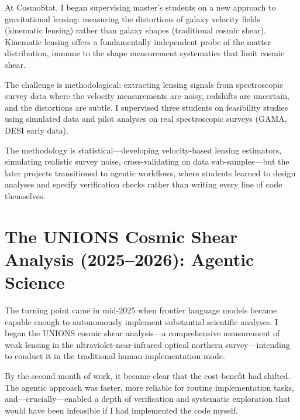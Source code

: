 \documentclass[11pt,a4paper]{article}
\begin{document}
At CosmoStat, I began supervising master's students on a new approach to gravitational lensing: measuring the distortions of galaxy velocity fields (kinematic lensing) rather than galaxy shapes (traditional cosmic shear). Kinematic lensing offers a fundamentally independent probe of the matter distribution, immune to the shape measurement systematics that limit cosmic shear.

The challenge is methodological: extracting lensing signals from spectroscopic survey data where the velocity measurements are noisy, redshifts are uncertain, and the distortions are subtle. I supervised three students on feasibility studies using simulated data and pilot analyses on real spectroscopic surveys (GAMA, DESI early data).

The methodology is statistical---developing velocity-based lensing estimators, simulating realistic survey noise, cross-validating on data sub-samples---but the later projects transitioned to agentic workflows, where students learned to design analyses and specify verification checks rather than writing every line of code themselves.

\section*{The UNIONS Cosmic Shear Analysis (2025--2026): Agentic Science}

The turning point came in mid-2025 when frontier language models became capable enough to autonomously implement substantial scientific analyses. I began the UNIONS cosmic shear analysis---a comprehensive measurement of weak lensing in the ultraviolet-near-infrared optical northern survey---intending to conduct it in the traditional human-implementation mode.

By the second month of work, it became clear that the cost-benefit had shifted. The agentic approach was faster, more reliable for routine implementation tasks, and---crucially---enabled a depth of verification and systematic exploration that would have been infeasible if I had implemented the code myself.
\end{document}

